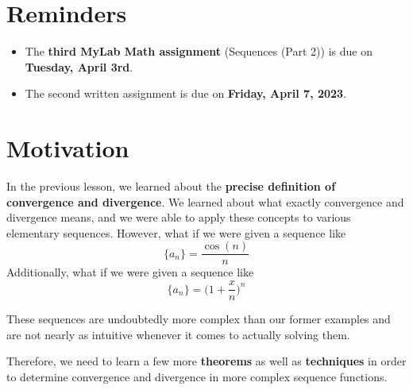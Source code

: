 \documentclass{report}
\newtheorem{thm}{Theorem}
\begin{document}
\begin{sloppypar}
\section{Reminders}
\begin{itemize}
  \item The \textbf{third MyLab Math assignment} (Sequences
        (Part 2)) is due on \textbf{Tuesday, April 3rd}.
  \item The second written assignment is due on \textbf{
        Friday, April 7, 2023}.
\end{itemize}
\section{Motivation}


In the previous lesson, we learned about the \textbf{precise
  definition of convergence and divergence}. We learned about
what exactly convergence and divergence means, and we were
able to apply these concepts to various elementary sequences.
However, what if we were given a sequence like
\[ \{a_{n}\} = \frac{\cos(n)}{n}\]
Additionally, what if we were given a sequence like
\[ \{a_{n}\} = \Biggr( 1 + \frac{x}{n} \Biggr)^{n}\]

These sequences are undoubtedly more complex than our former
examples and are not nearly as intuitive whenever it comes to
actually solving them.
\par Therefore, we need to learn a few more \textbf{theorems} as
well as \textbf{techniques} in order to determine convergence
and divergence in more complex sequence functions.
\begin{center}
\end{center}
\begin{center}
\end{center}
\end{sloppypar}
\end{document}
